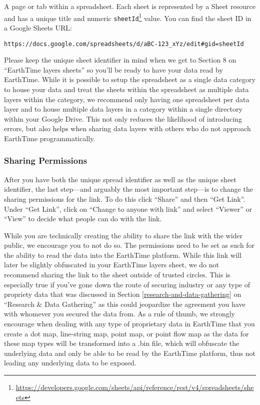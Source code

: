 \documentclass[
  12pt,
]{krantz}
\renewcommand{\href}[2]{#2\footnote{\url{#1}}}
\begin{document}
A page or tab within a spreadsheet. Each sheet is represented by a Sheet resource and has a unique title and numeric \href{https://developers.google.com/sheets/api/reference/rest/v4/spreadsheets/sheets}{\texttt{sheetId}} value. You can find the sheet ID in a Google Sheets URL:

\texttt{https://docs.google.com/spreadsheets/d/aBC-123\_xYz/edit\#gid=sheetId}

Please keep the unique sheet identifier in mind when we get to Section 8 on ``EarthTime layers sheets'' so you'll be ready to have your data read by EarthTime. While it is possible to setup the spreadsheet as a single data category to house your data and treat the sheets within the spreadsheet as multiple data layers within the category, we recommend only having one spreadsheet per data layer and to house multiple data layers in a category within a single directory within your Google Drive. This not only reduces the likelihood of introducing errors, but also helps when sharing data layers with others who do not approach EarthTime programmatically.

\hypertarget{sharing-permissions}{%
\subsubsection*{Sharing Permissions}\label{sharing-permissions}}


After you have both the unique spread identifier as well as the unique sheet identifier, the last step---and arguably the most important step---is to change the sharing permissions for the link. To do this click ``Share'' and then ``Get Link''. Under ``Get Link'', click on ``Change to anyone with link'' and select ``Viewer'' or ``View'' to decide what people can do with the link.

While you are technically creating the ability to share the link with the wider public, we encourage you to not do so. The permissions need to be set as such for the ability to read the data into the EarthTime platform. While this link will later be slightly obfuscated in your EarthTime layers sheet, we do not recommend sharing the link to the sheet outside of trusted circles. This is especially true if you've gone down the route of securing industry or any type of propriety data that was discussed in Section \ref{research-and-data-gathering} on ``Research \& Data Gathering'' as this could jeopardize the agreement you have with whomever you secured the data from. As a rule of thumb, we strongly encourage when dealing with any type of proprietary data in EarthTime that you create a dot map, line-string map, point map, or point flow map as the data for these map types will be transformed into a .bin file, which will obfuscate the underlying data and only be able to be read by the EarthTime platform, thus not leading any underlying data to be exposed.
\end{document}

